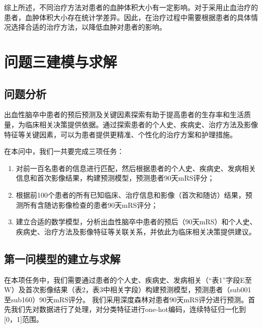\documentclass[bwprint]{gmcmthesis}
\begin{document}
综上所述，不同治疗方法对患者的血肿体积大小有一定影响。对于采用止血治疗的患者，血肿体积大小存在统计学差异。因此，在治疗过程中需要根据患者的具体情况选择合适的治疗方法，以降低血肿对患者的影响。

\section{问题三建模与求解}
\subsection{问题分析}
出血性脑卒中患者的预后预测及关键因素探索有助于提高患者的生存率和生活质量，为临床相关决策提供依据。通过探索患者的个人史、疾病史、治疗方法及影像特征等关键因素，可以为患者提供更精准、个性化的治疗方案和护理措施。

在本问中，我们一共要完成三项任务：
\begin{enumerate}
    \item 对前一百名患者的信息进行匹配，然后根据患者的个人史、疾病史、发病相关信息和首次影像结果，构建预测模型，预测患者90天mRS评分；
    \item 根据前100个患者的所有已知临床、治疗信息和影像（首次和随访）结果，预测所有含随访影像检查的患者90天mRS评分；
    \item 建立合适的数学模型，分析出血性脑卒中患者的预后（90天mRS）和个人史、疾病史、治疗方法及影像特征等关联关系，并依此为临床相关决策提供建议。

\end{enumerate}
    
\subsection{第一问模型的建立与求解}
在本项任务中，我们需要通过患者的个人史、疾病史、发病相关（“表1”字段E至W）及首次影像结果（表2，表3中相关字段）构建预测模型，预测患者（sub001至sub160）90天mRS评分。
我们采用深度森林对患者90天mRS评分进行预测。首先我们先对数据进行了处理，对分类特征进行one-hot编码，连续特征归一化到[0，1]范围。
\end{document}
